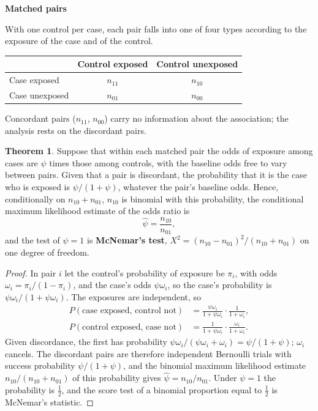 \documentclass[11pt,a4paper]{article}
\numberwithin{equation}{section}
\theoremstyle{definition}
\newtheorem{thm}{Theorem}[subsection]
\newcommand{\subhead}[1]{%
  \par\medskip\noindent\textbf{#1}\par\nobreak\smallskip}
\begin{document}
\subhead{Matched pairs}

With one control per case, each pair falls into one of four types according to the exposure of the case and of the control.
\begin{center}
\begin{tabular}{l|cc}
 & Control exposed & Control unexposed \\
\hline
Case exposed & $n_{11}$ & $n_{10}$ \\
Case unexposed & $n_{01}$ & $n_{00}$ \\
\end{tabular}
\end{center}
Concordant pairs ($n_{11}$, $n_{00}$) carry no information about the association; the analysis rests on the discordant pairs.

\begin{thm}
\label{thm:pairs}
Suppose that within each matched pair the odds of exposure among cases are $\psi$ times those among controls, with the baseline odds free to
vary between pairs. Given that a pair is discordant, the probability that it is the case who is exposed is $\psi/(1 + \psi)$, whatever the pair's
baseline odds. Hence, conditionally on $n_{10} + n_{01}$, $n_{10}$ is binomial with this probability, the conditional maximum likelihood estimate of
the odds ratio is
\[
\hat\psi = \frac{n_{10}}{n_{01}} ,
\]
and the test of $\psi = 1$ is \textbf{McNemar's test}, $X^2 = (n_{10} - n_{01})^2/(n_{10} + n_{01})$ on one degree of freedom.
\end{thm}

\begin{proof}
In pair $i$ let the control's probability of exposure be $\pi_i$, with odds $\omega_i = \pi_i/(1 - \pi_i)$, and the case's odds $\psi\omega_i$, so the case's
probability is $\psi\omega_i/(1 + \psi\omega_i)$. The exposures are independent, so
\begin{align*}
P(\text{case exposed, control not}) &= \frac{\psi\omega_i}{1 + \psi\omega_i} \cdot \frac{1}{1 + \omega_i} , \\
P(\text{control exposed, case not}) &= \frac{1}{1 + \psi\omega_i} \cdot \frac{\omega_i}{1 + \omega_i} .
\end{align*}
Given discordance, the first has probability $\psi\omega_i/(\psi\omega_i + \omega_i) = \psi/(1 + \psi)$; $\omega_i$ cancels. The discordant pairs are therefore independent
Bernoulli trials with success probability $\psi/(1 + \psi)$, and the binomial maximum likelihood estimate $n_{10}/(n_{10} + n_{01})$ of this probability
gives $\hat\psi = n_{10}/n_{01}$. Under $\psi = 1$ the probability is $\tfrac12$, and the score test of a binomial proportion equal to $\tfrac12$ is McNemar's statistic.
\end{proof}
\end{document}
